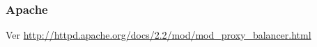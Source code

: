 \subsubsection{Apache}
\label{soa:tecnologias:apache}

Ver \url{http://httpd.apache.org/docs/2.2/mod/mod_proxy_balancer.html}
